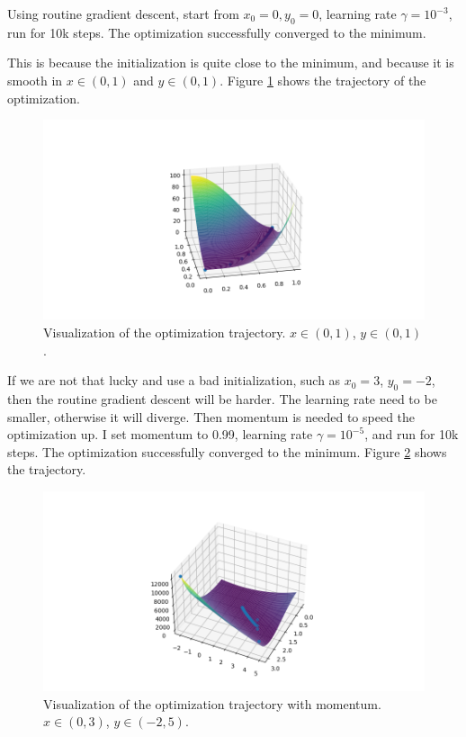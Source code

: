 Using routine gradient descent, start from $x_0=0, y_0=0$, learning rate $\gamma=10^{-3}$, run for 10k steps.
The optimization successfully converged to the minimum.

This is because the initialization is quite close to the minimum,
and because it is smooth in $x \in (0,1)$ and $ y \in (0,1)$.
Figure \ref{fig:routine_gd} shows the trajectory of the optimization.

\begin{figure}[h]
    \includegraphics[width=.8\textwidth]{./routine_gd.png}
    \caption{Visualization of the optimization trajectory. $x \in (0,1)$, $y \in (0,1)$.}
    \label{fig:routine_gd}
\end{figure}

If we are not that lucky and use a bad initialization, such as $x_0 = 3$, $y_0 = -2$,
then the routine gradient descent will be harder.
The learning rate need to be smaller, otherwise it will diverge.
Then momentum is needed to speed the optimization up.
I set momentum to 0.99, learning rate $\gamma=10^{-5}$, and run for 10k steps.
The optimization successfully converged to the minimum.
Figure \ref{fig:gd_m} shows the trajectory.

\begin{figure}[h]
    \includegraphics[width=.8\textwidth]{./gd_m.png}
    \caption{Visualization of the optimization trajectory with momentum. $x \in (0,3)$, $y \in (-2,5)$.}
    \label{fig:gd_m}
\end{figure}

